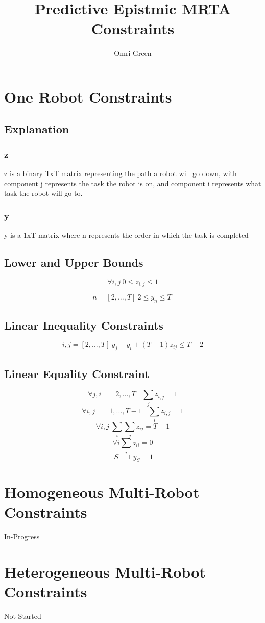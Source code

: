\documentclass[11pt]{report}
\title{\textbf{Predictive Epistmic MRTA Constraints}}
\author{Omri Green}
\date{}
\begin{document}
\maketitle
\thispagestyle{empty}

\chapter{One Robot Constraints}
\section{Explanation}
\subsection{z}
z is a binary TxT matrix representing the path a robot will go down, with component j represents the task the robot is on, and component i represents what task the robot will go to.

\subsection{y}
y is a 1xT matrix where n represents the order in which the task is completed
\section{Lower and Upper Bounds}
\[\forall i,j \ 0\leq z_{i,j} \leq 1\]

\[n=[2,...,T]\ 2\leq y_n\leq T \ \]
\section{Linear Inequality Constraints}

\[i,j=[2,...,T] \ y_j - y_i +(T-1)z_{ij} \leq T-2 \]
\section{Linear Equality Constraint}
\[ \forall j,i=[2,...,T]\ \underset{j}{\sum}z_{i,j}=1\]
\[\forall i,j=[1,...,T-1] \ \underset{i}{\sum}z_{i,j}=1\]
\[\forall i,j \ \underset{i}{\sum}\underset{j}{\sum}z_{ij}=T-1\]
\[\forall i \underset{i}{\sum}z_{ii}=0\]
\[\ S=1 \ y_S=1\]

\chapter{Homogeneous Multi-Robot Constraints}
In-Progress

\chapter {Heterogeneous Multi-Robot Constraints}
Not Started
\end{document}
